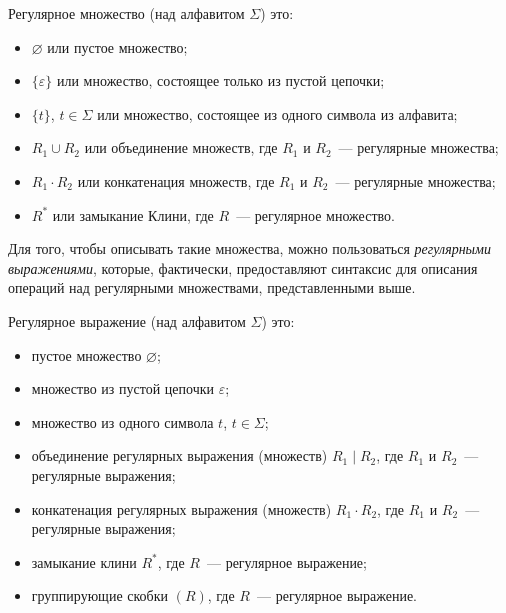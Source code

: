 \begin{definition}
    Регулярное множество (над алфавитом $\Sigma$) это:
    \begin{itemize}
        \item $\varnothing$ или пустое множество;
        \item $\{\varepsilon\}$ или множество, состоящее только из пустой цепочки;
        \item $\{t\}$, $t \in \Sigma$ или множество, состоящее из одного символа из алфавита;
        \item $R_1 \cup R_2$ или объединение множеств, где $R_1$ и $R_2$~--- регулярные множества;
        \item $R_1 \cdot R_2$ или конкатенация множеств, где $R_1$ и $R_2$~--- регулярные множества;
        \item $R^*$ или замыкание Клини, где $R$~--- регулярное множество.
    \end{itemize}
\end{definition}

Для того, чтобы описывать такие множества, можно пользоваться \emph{регулярными выражениями}, которые, фактически, предоставляют синтаксис для описания операций над регулярными множествами, представленными выше.

\begin{definition}
    Регулярное выражение (над алфавитом $\Sigma$) это:
    \begin{itemize}
        \item пустое множество $\varnothing$;
        \item множество из пустой цепочки $\varepsilon$;
        \item множество из одного символа $t$, $t \in \Sigma$;
        \item объединение регулярных выражения (множеств) $R_1 \mid R_2$, где $R_1$ и $R_2$~--- регулярные выражения;
        \item конкатенация регулярных выражения (множеств) $R_1 \cdot R_2$, где $R_1$ и $R_2$~--- регулярные выражения;
        \item замыкание клини $R^*$, где $R$~--- регулярное выражение;
        \item группирующие скобки $(R)$, где $R$~--- регулярное выражение.
    \end{itemize}
\end{definition}

